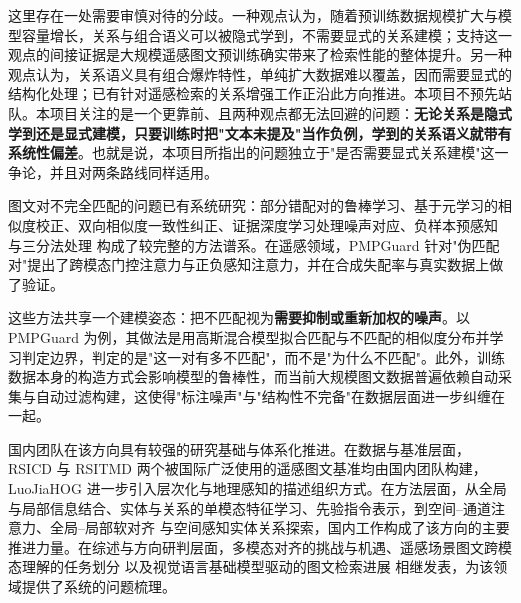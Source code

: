 这里存在一处需要审慎对待的分歧。一种观点认为，随着预训练数据规模扩大与模型容量增长，关系与组合语义可以被隐式学到，不需要显式的关系建模；支持这一观点的间接证据是大规模遥感图文预训练确实带来了检索性能的整体提升\cite{liu2024remoteclip,zhang2024rs5m,guo2024skysense}。另一种观点认为，关系语义具有组合爆炸特性，单纯扩大数据难以覆盖，因而需要显式的结构化处理；已有针对遥感检索的关系增强工作正沿此方向推进\cite{zhang2023unimodal,wu2024scat,shui2025esrn}。本项目不预先站队。本项目关注的是一个更靠前、且两种观点都无法回避的问题：\textbf{无论关系是隐式学到还是显式建模，只要训练时把"文本未提及"当作负例，学到的关系语义就带有系统性偏差}。也就是说，本项目所指出的问题独立于"是否需要显式关系建模"这一争论，并且对两条路线同样适用。


图文对不完全匹配的问题已有系统研究：部分错配对的鲁棒学习\cite{hu2023rcl}、基于元学习的相似度校正\cite{han2023msc}、双向相似度一致性纠正\cite{yang2023bicro}、证据深度学习处理噪声对应\cite{qin2022decl}、负样本预感知\cite{zhang2024npc} 与三分法处理\cite{feng2024tripartition} 构成了较完整的方法谱系。在遥感领域，PMPGuard 针对"伪匹配对"提出了跨模态门控注意力与正负感知注意力，并在合成失配率与真实数据上做了验证\cite{pmpguard2026}。

这些方法共享一个建模姿态：把不匹配视为\textbf{需要抑制或重新加权的噪声}。以 PMPGuard 为例，其做法是用高斯混合模型拟合匹配与不匹配的相似度分布并学习判定边界\cite{pmpguard2026}，判定的是"这一对有多不匹配"，而不是"为什么不匹配"。此外，训练数据本身的构造方式会影响模型的鲁棒性\cite{nguyen2022quality}，而当前大规模图文数据普遍依赖自动采集与自动过滤构建\cite{schuhmann2022laion}，这使得"标注噪声"与"结构性不完备"在数据层面进一步纠缠在一起。


国内团队在该方向具有较强的研究基础与体系化推进。在数据与基准层面，RSICD\cite{lu2018rsicd} 与 RSITMD\cite{yuan2022amfmn} 两个被国际广泛使用的遥感图文基准均由国内团队构建，LuoJiaHOG\cite{zhao2025luojiahog} 进一步引入层次化与地理感知的描述组织方式。在方法层面，从全局与局部信息结合\cite{yuan2022galr}、实体与关系的单模态特征学习\cite{zhang2023unimodal}、先验指令表示\cite{pan2023pir}，到空间--通道注意力\cite{wu2024scat}、全局--局部软对齐\cite{zhang2024glisa} 与空间感知实体关系探索\cite{shui2025esrn}，国内工作构成了该方向的主要推进力量。在综述与方向研判层面，多模态对齐的挑战与机遇\cite{lishutao2025alignment}、遥感场景图文跨模态理解的任务划分\cite{zhengxiangtao2025crossmodal} 以及视觉语言基础模型驱动的图文检索进展\cite{wuhui2026rsitr} 相继发表，为该领域提供了系统的问题梳理。

